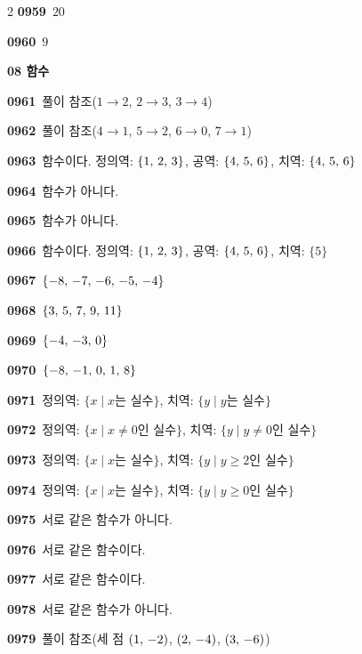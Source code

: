 \documentclass[10pt,a4paper]{article}
\begin{document}
\begin{multicols}{2}
\noindent\textbf{0959}\ $20$\par
\noindent\textbf{0960}\ $9$\par
\noindent\textbf{08 함수}\par\smallskip
\noindent\textbf{0961}\ 풀이 참조($1\longrightarrow 2$, $2\longrightarrow 3$, $3\longrightarrow 4$)\par
\noindent\textbf{0962}\ 풀이 참조($4\longrightarrow 1$, $5\longrightarrow 2$, $6\longrightarrow 0$, $7\longrightarrow 1$)\par
\noindent\textbf{0963}\ 함수이다. 정의역: $\{1,\mkern3mu 2,\mkern3mu 3\}$, 공역: $\{4,\mkern3mu 5,\mkern3mu 6\}$, 치역: $\{4,\mkern3mu 5,\mkern3mu 6\}$\par
\noindent\textbf{0964}\ 함수가 아니다.\par
\noindent\textbf{0965}\ 함수가 아니다.\par
\noindent\textbf{0966}\ 함수이다. 정의역: $\{1,\mkern3mu 2,\mkern3mu 3\}$, 공역: $\{4,\mkern3mu 5,\mkern3mu 6\}$, 치역: $\{5\}$\par
\noindent\textbf{0967}\ $\{-8,\mkern3mu -7,\mkern3mu -6,\mkern3mu -5,\mkern3mu -4\}$\par
\noindent\textbf{0968}\ $\{3,\mkern3mu 5,\mkern3mu 7,\mkern3mu 9,\mkern3mu 11\}$\par
\noindent\textbf{0969}\ $\{-4,\mkern3mu -3,\mkern3mu 0\}$\par
\noindent\textbf{0970}\ $\{-8,\mkern3mu -1,\mkern3mu 0,\mkern3mu 1,\mkern3mu 8\}$\par
\noindent\textbf{0971}\ 정의역: $\{x \mid x$는 실수$\}$, 치역: $\{y \mid y$는 실수$\}$\par
\noindent\textbf{0972}\ 정의역: $\{x \mid x\ne 0$인 실수$\}$, 치역: $\{y \mid y\ne 0$인 실수$\}$\par
\noindent\textbf{0973}\ 정의역: $\{x \mid x$는 실수$\}$, 치역: $\{y \mid y\ge 2$인 실수$\}$\par
\noindent\textbf{0974}\ 정의역: $\{x \mid x$는 실수$\}$, 치역: $\{y \mid y\ge 0$인 실수$\}$\par
\noindent\textbf{0975}\ 서로 같은 함수가 아니다.\par
\noindent\textbf{0976}\ 서로 같은 함수이다.\par
\noindent\textbf{0977}\ 서로 같은 함수이다.\par
\noindent\textbf{0978}\ 서로 같은 함수가 아니다.\par
\noindent\textbf{0979}\ 풀이 참조(세 점 $(1,\mkern3mu -2)$, $(2,\mkern3mu -4)$, $(3,\mkern3mu -6)$)\par

\end{multicols}
\end{document}

